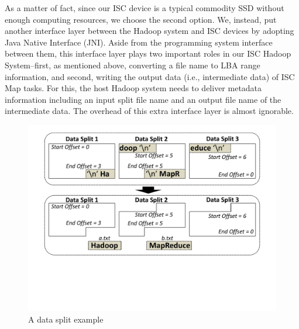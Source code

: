 As a matter of fact, since our ISC device is a typical commodity SSD without enough computing resources, we choose the second option. We, instead, put another interface layer between the Hadoop system and ISC devices by adopting Java Native Interface (JNI). Aside from the programming system interface between them, this interface layer plays two important roles in our ISC Hadoop System--first, as mentioned above, converting a file name to LBA range information, and second, writing the output data (i.e., intermediate data) of ISC Map tasks. For this, the host Hadoop system needs to deliver metadata information including an input split file name and an output file name of the intermediate data. The overhead of this extra interface layer is almost ignorable.


\begin{figure}[htbp]
	\centering
		\includegraphics[width=1.0\columnwidth]{figures/Data_split_example2.pdf}
	\caption{A data split example}
	\label{fig:data_split_example}
\end{figure}


